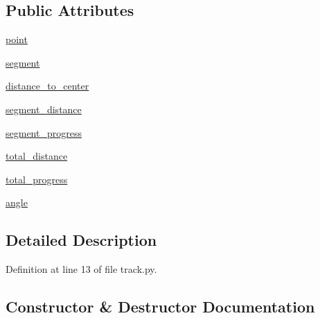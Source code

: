 \subsection*{Public Attributes}
\begin{DoxyCompactItemize}
\item 
\hyperlink{classsimulation__tools_1_1track_1_1_track_position_a5c5ad2aecf6e00e6611e8ad70b38de7b}{point}
\item 
\hyperlink{classsimulation__tools_1_1track_1_1_track_position_ab5feb6f2789576c88fe7310f28e4c4db}{segment}
\item 
\hyperlink{classsimulation__tools_1_1track_1_1_track_position_a1d45644ad2113e0c7a8e546f52015d46}{distance\+\_\+to\+\_\+center}
\item 
\hyperlink{classsimulation__tools_1_1track_1_1_track_position_a89c184a72d3b1636bf9531de144374e4}{segment\+\_\+distance}
\item 
\hyperlink{classsimulation__tools_1_1track_1_1_track_position_a1ce2f49333cc2e6d5ac1094a3e919eeb}{segment\+\_\+progress}
\item 
\hyperlink{classsimulation__tools_1_1track_1_1_track_position_a488a7374a672827079686cf7fece12ee}{total\+\_\+distance}
\item 
\hyperlink{classsimulation__tools_1_1track_1_1_track_position_a0471b3519ccab2dfd048ed02853f8a8d}{total\+\_\+progress}
\item 
\hyperlink{classsimulation__tools_1_1track_1_1_track_position_a4809c7245ab044b2b3ca96fbdc80fe72}{angle}
\end{DoxyCompactItemize}


\subsection{Detailed Description}


Definition at line 13 of file track.\+py.



\subsection{Constructor \& Destructor Documentation}
